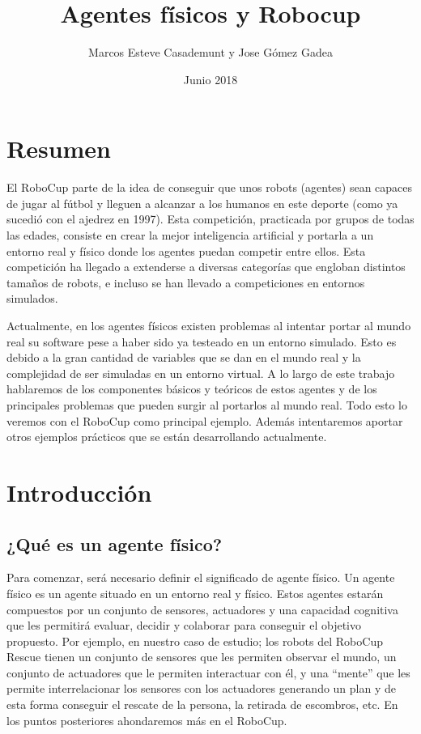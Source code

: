 \documentclass[11pt,oneside,a4paper]{book}
\title{Agentes físicos y Robocup}
\author{Marcos Esteve Casademunt y Jose Gómez Gadea}
\date{Junio 2018}
\begin{document}
\maketitle
\tableofcontents
\listoffigures
\chapter{Resumen}
El RoboCup parte de la idea de conseguir que unos robots (agentes) sean capaces de jugar al fútbol y lleguen a alcanzar a los humanos en este deporte (como ya sucedió con el ajedrez en 1997). Esta competición, practicada por grupos de todas las edades, consiste en crear la mejor inteligencia artificial y portarla a un entorno real y físico donde los agentes puedan competir entre ellos. Esta competición ha llegado a extenderse a diversas categorías que engloban distintos tamaños de robots, e incluso se han llevado a competiciones en entornos simulados.

Actualmente, en los agentes físicos existen problemas al intentar portar al mundo real su software pese a haber sido ya testeado en un entorno simulado. Esto es debido a la gran cantidad de variables que se dan en el mundo real y la complejidad de ser simuladas en un entorno virtual. A lo largo de este trabajo hablaremos de los componentes básicos y teóricos de estos agentes y de los principales problemas que pueden surgir al portarlos al mundo real. Todo esto lo veremos con el RoboCup como principal ejemplo. Además intentaremos aportar otros ejemplos prácticos que se están desarrollando actualmente. 

\chapter{Introducción}
\section{¿Qué es un agente físico?}
Para comenzar, será necesario definir el significado de agente físico. Un agente físico es un agente situado en un entorno real y físico. Estos agentes estarán compuestos por un conjunto de sensores, actuadores y una capacidad cognitiva que les permitirá evaluar, decidir y colaborar para conseguir el objetivo propuesto. Por ejemplo, en nuestro caso de estudio; los robots del RoboCup Rescue tienen un conjunto de sensores que les permiten observar el mundo, un conjunto de actuadores que le permiten interactuar con él, y una “mente” que les permite interrelacionar los sensores con los actuadores generando un plan y de esta forma conseguir el rescate de la persona, la retirada de escombros, etc. En los puntos posteriores ahondaremos más en el RoboCup.
\end{document}
